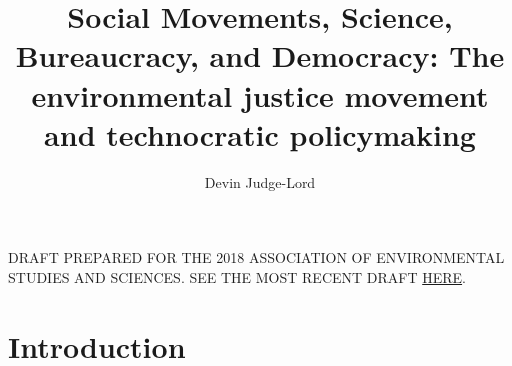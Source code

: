 \documentclass{article}
\title{Social Movements, Science, Bureaucracy, and Democracy: The environmental justice movement and technocratic policymaking}
\author{Devin Judge-Lord} %
\begin{document}
\maketitle
\centering
DRAFT PREPARED FOR THE 2018 ASSOCIATION OF ENVIRONMENTAL STUDIES AND SCIENCES. SEE THE MOST RECENT DRAFT \href{https://github.com/judgelord/dissertation/raw/master/ej.pdf}{HERE}.
\abstract{}


\newpage
\doublespace

\section{Introduction} \label{intro}


\singlespace
\small
 

\end{document}
